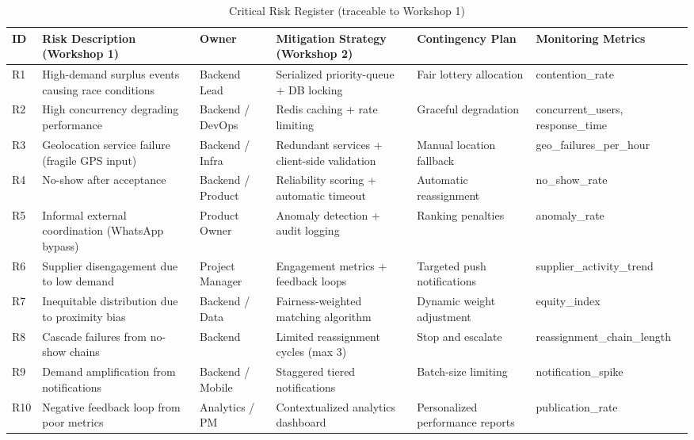 \documentclass[9pt,conference]{IEEEtran}
\begin{document}
\begin{table}[h]
\centering
\small
\begin{threeparttable}
\caption{Critical Risk Register (traceable to Workshop 1)}
\label{critical-risk-register}
\begin{tabularx}{\textwidth}{@{} l X l X X X @{}}
\toprule
\textbf{ID} & \textbf{Risk Description (Workshop 1)} & \textbf{Owner} & \textbf{Mitigation Strategy (Workshop 2)} & \textbf{Contingency Plan} & \textbf{Monitoring Metrics} \\
\midrule
R1 & High-demand surplus events causing race conditions & Backend Lead & Serialized priority-queue + DB locking & Fair lottery allocation & contention\_rate \\
R2 & High concurrency degrading performance & Backend / DevOps & Redis caching + rate limiting & Graceful degradation & concurrent\_users, response\_time \\
R3 & Geolocation service failure (fragile GPS input) & Backend / Infra & Redundant services + client-side validation & Manual location fallback & geo\_failures\_per\_hour \\
R4 & No-show after acceptance & Backend / Product & Reliability scoring + automatic timeout & Automatic reassignment & no\_show\_rate \\
R5 & Informal external coordination (WhatsApp bypass) & Product Owner & Anomaly detection + audit logging & Ranking penalties & anomaly\_rate \\
R6 & Supplier disengagement due to low demand & Project Manager & Engagement metrics + feedback loops & Targeted push notifications & supplier\_activity\_trend \\
R7 & Inequitable distribution due to proximity bias & Backend / Data & Fairness-weighted matching algorithm & Dynamic weight adjustment & equity\_index \\
R8 & Cascade failures from no-show chains & Backend & Limited reassignment cycles (max 3) & Stop and escalate & reassignment\_chain\_length \\
R9 & Demand amplification from notifications & Backend / Mobile & Staggered tiered notifications & Batch-size limiting & notification\_spike \\
R10 & Negative feedback loop from poor metrics & Analytics / PM & Contextualized analytics dashboard & Personalized performance reports & publication\_rate \\
\bottomrule
\end{tabularx}
\end{threeparttable}
\end{table}
\end{document}
